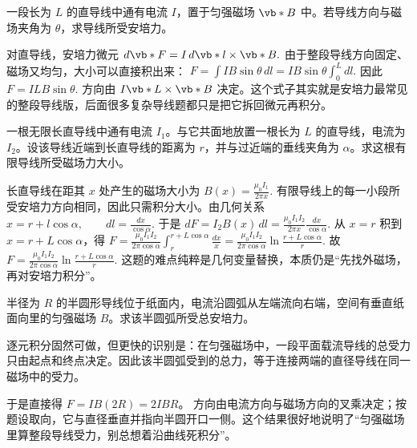 \documentclass[lang=cn,11pt]{elegantbook}
\begin{document}
\begin{exercise}[长直载流导线在匀强磁场中的受力]
一段长为 \(L\) 的直导线中通有电流 \(I\)，置于匀强磁场 \(\vb*{B}\) 中。若导线方向与磁场夹角为 \(\theta\)，求导线所受安培力。
\end{exercise}

\begin{solution}
对直导线，安培力微元
 \(d\vb*{F}=I\,d\vb*{l}\times \vb*{B}.\) 
由于整段导线方向固定、磁场又均匀，大小可以直接积出来：
 \(F=\int I B\sin\theta\,dl =IB\sin\theta\int_0^L dl.\) 
因此
 \(\boxed{F=ILB\sin\theta}.\) 
方向由 \(I\vb*{L}\times \vb*{B}\) 决定。这个式子其实就是安培力最常见的整段导线版，后面很多复杂导线题都只是把它拆回微元再积分。
\end{solution}

\begin{exercise}[有限长直导线受无限长直导线的磁场力]
一根无限长直导线中通有电流 \(I_1\)。与它共面地放置一根长为 \(L\) 的直导线，电流为 \(I_2\)。设该导线近端到长直导线的距离为 \(r\)，并与过近端的垂线夹角为 \(\alpha\)。求这根有限导线所受磁场力大小。
\end{exercise}

\begin{solution}
长直导线在距其 \(x\) 处产生的磁场大小为
 \(B(x)=\frac{\mu_0I_1}{2\pi x}.\) 
有限导线上的每一小段所受安培力方向相同，因此只需积分大小。由几何关系
 \(x=r+l\cos\alpha, \qquad dl=\frac{dx}{\cos\alpha}.\) 
于是
 \(dF=I_2B(x)\,dl =\frac{\mu_0I_1I_2}{2\pi x}\frac{dx}{\cos\alpha}.\) 
从 \(x=r\) 积到 \(x=r+L\cos\alpha\)，得
 \(F=\frac{\mu_0I_1I_2}{2\pi\cos\alpha}\int_r^{r+L\cos\alpha}\frac{dx}{x} =\frac{\mu_0I_1I_2}{2\pi\cos\alpha}\ln\frac{r+L\cos\alpha}{r}.\) 
故
 \(\boxed{ F=\frac{\mu_0I_1I_2}{2\pi\cos\alpha}\ln\frac{r+L\cos\alpha}{r} }.\) 
这题的难点纯粹是几何变量替换，本质仍是“先找外磁场，再对安培力积分”。
\end{solution}

\begin{exercise}[半圆形载流导线在匀强磁场中的受力]
半径为 \(R\) 的半圆形导线位于纸面内，电流沿圆弧从左端流向右端，空间有垂直纸面向里的匀强磁场 \(B\)。求该半圆弧所受总安培力。
\end{exercise}

\begin{solution}
逐元积分固然可做，但更快的识别是：在匀强磁场中，一段平面载流导线的总受力只由起点和终点决定。因此该半圆弧受到的总力，等于连接两端的直径导线在同一磁场中的受力。

于是直接得 \(F=IB(2R)=2IBR\)。
方向由电流方向与磁场方向的叉乘决定；按题设取向，它与直径垂直并指向半圆开口一侧。这个结果很好地说明了“匀强磁场里算整段导线受力，别总想着沿曲线死积分”。
\end{solution}
\end{document}

